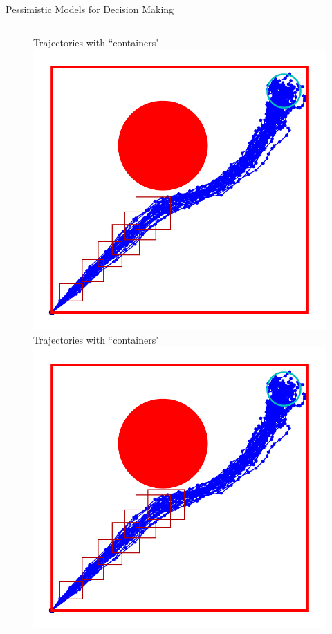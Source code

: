 \documentclass[lecture]{beamer}
\begin{document}
\begin{frame}{\normalsize Pessimistic Models for Decision Making}
\begin{columns}[t]
\begin{overlayarea}{\textwidth}{0.6\textheight}
\begin{figure}
{        }%
        {%
                \center
        Trajectories with ``containers"
   \includegraphics[width=\FS\textwidth]{Codes/BasicsSafety/PessimisticModel6.pdf}%
        }%
        {%
                \center
        Trajectories with ``containers"
  \includegraphics[width=\FS\textwidth]{Codes/BasicsSafety/PessimisticModel7.pdf}%
}
\end{figure}
\end{overlayarea}
\end{columns}
\end{frame}
\end{document}
